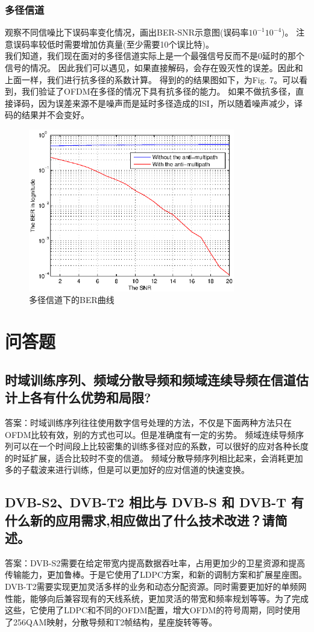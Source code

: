 \documentclass{article}
\begin{document}
\subsubsection{多径信道}
观察不同信噪比下误码率变化情况，画出BER-SNR示意图(误码率\(10^{-1}\)\(10^{-4}\))。
注意误码率较低时需要增加仿真量(至少需要10个误比特)。\\
我们知道，我们现在面对的多径信道实际上是一个最强信号反而不是0延时的那个信号的情况。
因此我们可以遇见，如果直接解码，会存在毁灭性的误差。因此和上面一样，我们进行抗多径的系数计算。
得到的的结果图如下，为Fig. 7。可以看到，我们验证了OFDM在多径的情况下具有抗多径的能力。
如果不做抗多径，直接译码，因为误差来源不是噪声而是延时多径造成的ISI，所以随着噪声减少，译码的结果并不会变好。
\begin{figure}[t]
\centering
\includegraphics[width=9cm]{7.eps}
\caption{多径信道下的BER曲线}
\end{figure}
\newpage
\section{问答题}
\subsection{时域训练序列、频域分散导频和频域连续导频在信道估计上各有什么优势和局限?}
答案：时域训练序列往往使用数字信号处理的方法，不仅是下面两种方法只在OFDM比较有效，别的方式也可以。但是准确度有一定的劣势。
频域连续导频序列可以在一个时间段上比较密集的训练多径对应的系数，可以很好的应对各种长度的时延扩展，适合比较时不变的信道。
频域分散导频序列相比起来，会消耗更加多的子载波来进行训练，但是可以更加好的应对信道的快速变换。
\subsection{DVB-S2、DVB-T2 相比与 DVB-S 和 DVB-T 有什么新的应用需求,相应做出了什么技术改进？请简述。}
答案：DVB-S2需要在给定带宽内提高数据吞吐率，占用更加少的卫星资源和提高传输能力，更加鲁棒。于是它使用了LDPC方案，和新的调制方案和扩展星座图。\\
DVB-T2需要实现更加灵活多样的业务和动态分配资源。同时需要更加好的单频网性能，能够向后兼容现有的天线系统，更加灵活的带宽和频率规划等等。为了完成这些，它使用了LDPC和不同的OFDM配置，增大OFDM的符号周期，同时使用了256QAM映射，分散导频和T2帧结构，星座旋转等等。
\end{document}
